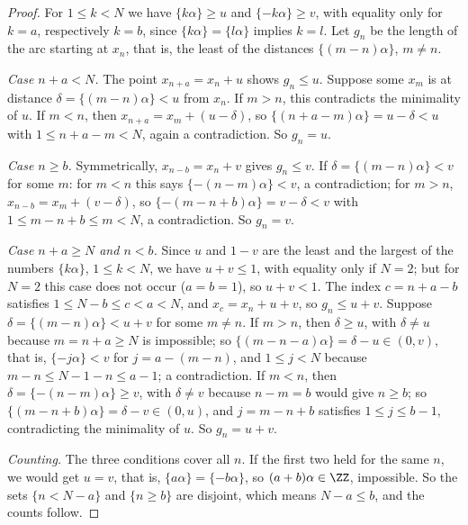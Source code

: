 \begin{proof}
For $1 \leq k < N$ we have $\{k\alpha\} \geq u$ and $\{-k\alpha\} \geq v$, with equality only for $k = a$, respectively $k = b$, since $\{k\alpha\} = \{l\alpha\}$ implies $k = l$. Let $g_n$ be the length of the
arc starting at $x_n$, that is, the least of the distances $\{(m - n)\alpha\}$, $m \neq n$.

\emph{Case $n + a < N$.} The point $x_{n+a} = x_n + u$ shows $g_n \leq u$. Suppose some $x_m$ is at distance $\delta = \{(m - n)\alpha\} < u$ from $x_n$. If $m > n$, this contradicts the minimality of $u$.
If $m < n$, then $x_{n+a} = x_m + (u - \delta)$, so $\{(n + a - m)\alpha\} = u - \delta < u$ with $1 \leq n + a - m < N$, again a contradiction. So $g_n = u$.

\emph{Case $n \geq b$.} Symmetrically, $x_{n-b} = x_n + v$ gives $g_n \leq v$. If $\delta = \{(m - n)\alpha\} < v$ for some $m$: for $m < n$ this says $\{-(n - m)\alpha\} < v$, a contradiction; for $m > n$,
$x_{n-b} = x_m + (v - \delta)$, so $\{-(m - n + b)\alpha\} = v - \delta < v$ with $1 \leq m - n + b \leq m < N$, a contradiction. So $g_n = v$.

\emph{Case $n + a \geq N$ and $n < b$.} Since $u$ and $1 - v$ are the least and the largest of the numbers $\{k\alpha\}$, $1 \leq k < N$, we have $u + v \leq 1$, with equality only if $N = 2$; but for
$N = 2$ this case does not occur ($a = b = 1$), so $u + v < 1$. The index $c = n + a - b$ satisfies $1 \leq N - b \leq c < a < N$, and $x_c = x_n + u + v$, so $g_n \leq u + v$. Suppose
$\delta = \{(m - n)\alpha\} < u + v$ for some $m \neq n$. If $m > n$, then $\delta \geq u$, with $\delta \neq u$ because $m = n + a \geq N$ is impossible; so $\{(m - n - a)\alpha\} = \delta - u \in (0, v)$,
that is, $\{-j\alpha\} < v$ for $j = a - (m - n)$, and $1 \leq j < N$ because $m - n \leq N - 1 - n \leq a - 1$; a contradiction. If $m < n$, then $\delta = \{-(n - m)\alpha\} \geq v$, with $\delta \neq v$
because $n - m = b$ would give $n \geq b$; so $\{(m - n + b)\alpha\} = \delta - v \in (0, u)$, and $j = m - n + b$ satisfies $1 \leq j \leq b - 1$, contradicting the minimality of $u$. So $g_n = u + v$.

\emph{Counting.} The three conditions cover all $n$. If the first two held for the same $n$, we would get $u = v$, that is, $\{a\alpha\} = \{-b\alpha\}$, so $(a + b)\alpha \in \ZZ$, impossible. So the
sets $\{n < N - a\}$ and $\{n \geq b\}$ are disjoint, which means $N - a \leq b$, and the counts follow.
\end{proof}

